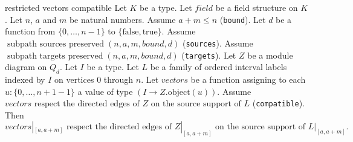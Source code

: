 \begin{cleanresult}{restricted vectors compatible}
Let $K$ be a type.
Let $\mathit{field}$ be a field structure on $K$.
Let $n$, $a$ and $m$ be natural numbers.
Assume $a + m \le n$ (\texttt{bound}).
Let $d$ be a function from $\{0,\ldots,n-1\}$ to $\{\mathrm{false},\mathrm{true}\}$.
Assume $\operatorname{subpath\ sources\ preserved}(n, a, m, \mathit{bound}, d)$ (\texttt{sources}).
Assume $\operatorname{subpath\ targets\ preserved}(n, a, m, \mathit{bound}, d)$ (\texttt{targets}).
Let $Z$ be a module diagram on $Q_{d}$.
Let $I$ be a type.
Let $L$ be a family of ordered interval labels indexed by $I$ on vertices $0$ through $n$.
Let $\mathit{vectors}$ be a function assigning to each $u : \{0,\ldots,n + 1-1\}$ a value of type $(I\to Z.\mathrm{object}(u))$.
Assume $\mathit{vectors}\text{ respect the directed edges of }Z\text{ on the source support of }L$ (\texttt{compatible}).
Then \[\mathit{vectors}|_{[a,a+m]}\text{ respect the directed edges of }Z|_{[a,a+m]}\text{ on the source support of }L|_{[a,a+m]}.\]
\end{cleanresult}

